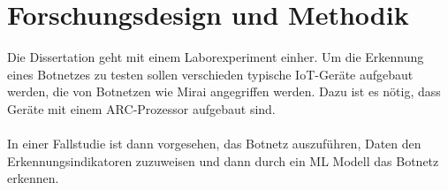 \section{Forschungsdesign und Methodik}
Die Dissertation geht mit einem Laborexperiment einher. Um die Erkennung eines 
Botnetzes zu testen sollen verschieden typische IoT-Geräte aufgebaut werden, die 
von Botnetzen wie Mirai angegriffen werden. Dazu ist es nötig, dass Geräte mit einem
ARC-Prozessor aufgebaut sind. \\ \\
In einer Fallstudie ist dann vorgesehen, das Botnetz auszuführen,
Daten den Erkennungsindikatoren zuzuweisen und dann durch ein ML Modell das Botnetz erkennen.
